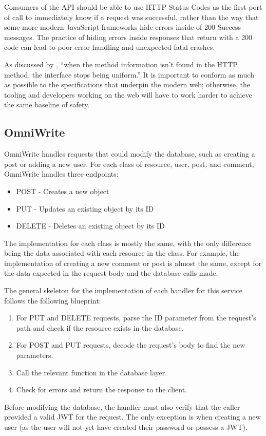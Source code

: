 Consumers of the API should be able to use HTTP Status Codes as the first port of call to immediately know if a request was successful, rather than the way that some more modern JavaScript frameworks hide errors inside of 200 Success messages.
The practice of hiding errors inside responses that return with a 200 code can lead to poor error handling and unexpected fatal crashes.

As discussed by \citeauthor{richardson2008restful}, ``when the method information isn’t found in the HTTP method, the interface stops being uniform.''
It is important to conform as much as possible to the specifications that underpin the modern web; otherwise, the tooling and developers working on the web will have to work harder to achieve the same baseline of safety.

\subsection{OmniWrite}
OmniWrite handles requests that could modify the database, such as creating a post or adding a new user. 
For each class of resource, user, post, and comment, OmniWrite handles three endpoints:
\begin{itemize}
    \item POST - Creates a new object
    \item PUT - Updates an existing object by its ID
    \item DELETE - Deletes an existing object by its ID
\end{itemize}
The implementation for each class is mostly the same, with the only difference being the data associated with each resource in the class.
For example, the implementation of creating a new comment or post is almost the same, except for the data expected in the request body and the database calls made. 

The general skeleton for the implementation of each handler for this service follows the following blueprint:
\begin{enumerate}
    \item For PUT and DELETE requests, parse the ID parameter from the request's path and check if the resource exists in the database.
    \item For POST and PUT requests, decode the request's body to find the new parameters.
    \item Call the relevant function in the database layer.
    \item Check for errors and return the response to the client.
\end{enumerate}
Before modifying the database, the handler must also verify that the caller provided a valid JWT for the request.
The only exception is when creating a new user (as the user will not yet have created their password or possess a JWT). 

